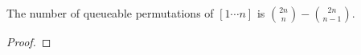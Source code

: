 \begin{frame}{}
  \begin{theorem}
    The number of queueable permutations of $[1 \cdots n]$ is ${2n \choose n} - {2n \choose n-1}$.
  \end{theorem}

  \pause
  \vspace{0.30cm}
  \begin{proof}
  \end{proof}
\end{frame}

